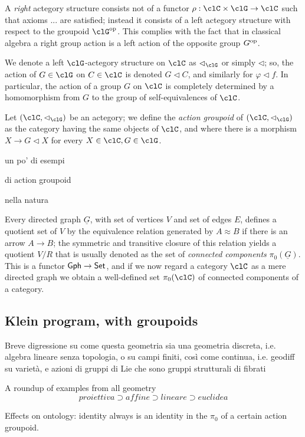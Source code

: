 \documentclass{amsart}
\begin{document}
\begin{remark}
  A \emph{right} actegory structure consists not of a functor $\rho : \clC \times \clG \to \clC$ such that axioms ... are satisfied; instead it consists of a left actegory structure with respect to the groupoid $\clG^\op$. This complies with the fact that in classical algebra a right group action is a left action of the opposite group $G^{\text{op}}$.
\end{remark}
\begin{notation}
  We denote a left $\clG$-actegory structure on $\clC$ as $\lhd_\clG$ or simply $\lhd$; so, the action of $G \in\clG$ on $C \in \clC$ is denoted $G\lhd C$, and similarly for $\varphi\lhd f$. In particular, the action of a group $G$ on $\clC$ is completely determined by a homomorphism from $G$ to the group of self-equivalences of $\clC$.
\end{notation}
\begin{definition}
Let $(\clC,\lhd_\clG)$ be an actegory; we define the \emph{action groupoid} of $(\clC,\lhd_\clG)$ as the category having the same objects of $\clC$, and where there is a morphism $X\to G\lhd X$ for every $X\in\clC, G\in\clG$.
\end{definition}
\begin{example}
un po' di esempi
\end{example}
\begin{example}
di action groupoid
\end{example}
\begin{example}
nella natura
\end{example}
\begin{definition}
Every directed graph $\underline G$, with set of vertices $V$ and set of edges $E$, defines a quotient set of $V$ by the equivalence relation generated by $A\approx B$ if there is an arrow $A\to B$; the symmetric and transitive closure of this relation yields a quotient $V/R$ that is usually denoted as the set of \emph{connected components} $\pi_0(\underline G)$. This is a functor ${\sf Gph} \to \mathsf{Set}$, and if we now regard a category $\clC$ as a mere directed graph we obtain a well-defined set $\pi_0(\clC)$ of connected components of a category.
\end{definition}
\subsection{Klein program, with groupoids}
\begin{remark}
Breve digressione su come questa geometria sia una geometria discreta, i.e. algebra lineare senza topologia, o su campi finiti, così come continua, i.e. geodiff su varietà, e azioni di gruppi di Lie che sono gruppi strutturali di fibrati
\end{remark}
\begin{example}
  A roundup of examples from all geometry
\[proiettiva \supset affine \supset lineare \supset euclidea\]
\end{example}
Effects on ontology: identity always is an identity in the $\pi_0$ of a certain action groupoid.
\end{document}
